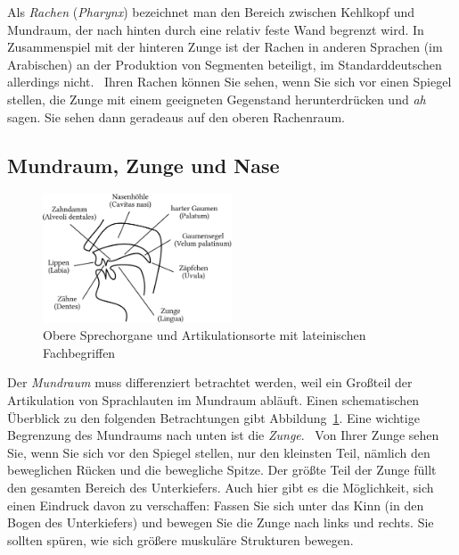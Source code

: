Als \textit{Rachen} (\textit{Pharynx}) bezeichnet man den Bereich zwischen Kehlkopf und Mundraum, der nach hinten durch eine relativ feste Wand begrenzt wird.
In Zusammenspiel mit der hinteren Zunge ist der Rachen in anderen Sprachen (\zB im Arabischen) an der Produktion von Segmenten beteiligt, im Standarddeutschen allerdings nicht.
\TuBegin~Ihren Rachen können Sie sehen, wenn Sie sich vor einen Spiegel stellen, die Zunge mit einem geeigneten Gegenstand herunterdrücken und \textit{ah} sagen.
Sie sehen dann geradeaus auf den oberen Rachenraum.

\subsection{Mundraum, Zunge und Nase}
\label{sec:mundraumzungeundnase}

\begin{figure}[!htbp]
  \centering
  \includegraphics[width=0.5\textwidth]{figures/mundraum}
  \caption[Obere Sprechorgane und Artikulationsorte]{Obere Sprechorgane und Artikulationsorte mit lateinischen Fachbegriffen}
  \label{fig:mundraumzungeundnase003}
\end{figure}

Der \textit{Mundraum} muss differenziert betrachtet werden, weil ein Großteil der Artikulation von Sprachlauten im Mundraum abläuft.
Einen schematischen Überblick zu den folgenden Betrachtungen gibt Abbildung~\ref{fig:mundraumzungeundnase003}.
Eine wichtige Begrenzung des Mundraums nach unten ist die \textit{Zunge}.
\TuBegin~Von Ihrer Zunge sehen Sie, wenn Sie sich vor den Spiegel stellen, nur den kleinsten Teil, nämlich den beweglichen Rücken und die bewegliche Spitze.
Der größte Teil der Zunge füllt den gesamten Bereich des Unterkiefers.
Auch hier gibt es die Möglichkeit, sich einen Eindruck davon zu verschaffen:
Fassen Sie sich unter das Kinn (in den Bogen des Unterkiefers) und bewegen Sie die Zunge nach links und rechts.
Sie sollten spüren, wie sich größere muskuläre Strukturen bewegen.

